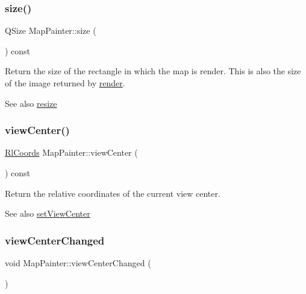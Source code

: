 \subsubsection{\texorpdfstring{size()}{size()}}
{\footnotesize\ttfamily Q\+Size Map\+Painter\+::size (\begin{DoxyParamCaption}{ }\end{DoxyParamCaption}) const}

Return the size of the rectangle in which the map is render. This is also the size of the image returned by \hyperlink{class_map_painter_a1c20cf03d0376290481bd80b9f8ef013}{render}.

\begin{DoxySeeAlso}{See also}
\hyperlink{class_map_painter_ae215f704c3f1ee11bb89861b9b4b13d3}{resize} 
\end{DoxySeeAlso}
\hypertarget{class_map_painter_a268279c396ea9502059bf1901f0c686c}{}\label{class_map_painter_a268279c396ea9502059bf1901f0c686c} 
\subsubsection{\texorpdfstring{view\+Center()}{viewCenter()}}
{\footnotesize\ttfamily \hyperlink{class_rl_coords}{Rl\+Coords} Map\+Painter\+::view\+Center (\begin{DoxyParamCaption}{ }\end{DoxyParamCaption}) const}

Return the relative coordinates of the current view center.

\begin{DoxySeeAlso}{See also}
\hyperlink{class_map_painter_a435c535da8087a54ba09c71232377508}{set\+View\+Center} 
\end{DoxySeeAlso}
\hypertarget{class_map_painter_a15c872dbb6a7321b978928df5b850ea3}{}\label{class_map_painter_a15c872dbb6a7321b978928df5b850ea3} 
\subsubsection{\texorpdfstring{view\+Center\+Changed}{viewCenterChanged}}
{\footnotesize\ttfamily void Map\+Painter\+::view\+Center\+Changed (\begin{DoxyParamCaption}\item[{Q\+Point}]{ }\end{DoxyParamCaption})\hspace{0.3cm}{\ttfamily [signal]}}

